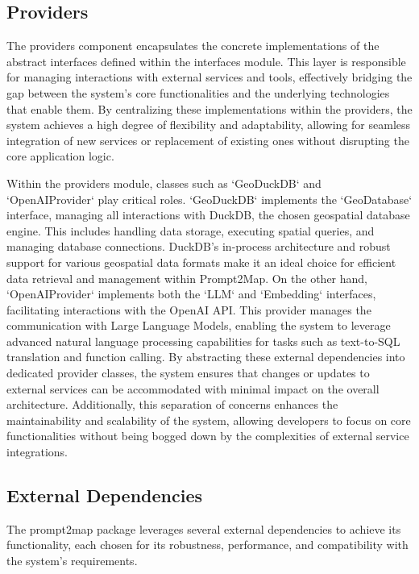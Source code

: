 \subsection{Providers}
The providers component encapsulates the concrete implementations of the abstract interfaces defined within the interfaces module. This layer is responsible for managing interactions with external services and tools, effectively bridging the gap between the system's core functionalities and the underlying technologies that enable them. By centralizing these implementations within the providers, the system achieves a high degree of flexibility and adaptability, allowing for seamless integration of new services or replacement of existing ones without disrupting the core application logic.

Within the providers module, classes such as `GeoDuckDB` and `OpenAIProvider` play critical roles. `GeoDuckDB` implements the `GeoDatabase` interface, managing all interactions with DuckDB, the chosen geospatial database engine. This includes handling data storage, executing spatial queries, and managing database connections. DuckDB's in-process architecture and robust support for various geospatial data formats make it an ideal choice for efficient data retrieval and management within Prompt2Map. On the other hand, `OpenAIProvider` implements both the `LLM` and `Embedding` interfaces, facilitating interactions with the OpenAI API. This provider manages the communication with Large Language Models, enabling the system to leverage advanced natural language processing capabilities for tasks such as text-to-SQL translation and function calling. By abstracting these external dependencies into dedicated provider classes, the system ensures that changes or updates to external services can be accommodated with minimal impact on the overall architecture. Additionally, this separation of concerns enhances the maintainability and scalability of the system, allowing developers to focus on core functionalities without being bogged down by the complexities of external service integrations.

\subsection{External Dependencies}
The prompt2map package leverages several external dependencies to achieve its functionality, each chosen for its robustness, performance, and compatibility with the system's requirements.

